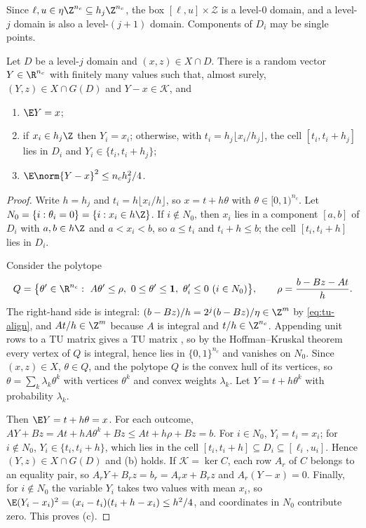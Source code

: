 Since $\ell,u\in\eta\Z^{n_c}\subseteq h_j\Z^{n_c}$, the box
$[\ell,u]\times\mathcal Z$ is a level-$0$ domain, and a level-$j$ domain is
also a level-$(j+1)$ domain. Components of $D_i$ may be single points.

\begin{lemma}\label{lem:tu-round}
Let $D$ be a level-$j$ domain and $(x,z)\in X\cap D$. There is a random vector
$Y\in\R^{n_c}$ with finitely many values such that, almost surely,
$(Y,z)\in X\cap G(D)$ and $Y-x\in\mathcal K$, and
\begin{enumerate}[label=(\alph*)]
\item $\E Y=x$;
\item if $x_i\in h_j\Z$ then $Y_i=x_i$; otherwise, with
$t_i=h_j\lfloor x_i/h_j\rfloor$, the cell $[t_i,t_i+h_j]$ lies in $D_i$ and
$Y_i\in\{t_i,t_i+h_j\}$;
\item $\E\norm{Y-x}^2\le n_ch_j^2/4$.
\end{enumerate}
\end{lemma}

\begin{proof}
Write $h=h_j$ and $t_i=h\lfloor x_i/h\rfloor$, so $x=t+h\theta$ with
$\theta\in[0,1)^{n_c}$. Let $N_0=\{i:\theta_i=0\}=\{i:x_i\in h\Z\}$. If
$i\notin N_0$, then $x_i$ lies in a component $[a,b]$ of $D_i$ with
$a,b\in h\Z$ and $a<x_i<b$, so $a\le t_i$ and $t_i+h\le b$; the cell
$[t_i,t_i+h]$ lies in $D_i$.

Consider the polytope
\[
Q=\bigl\{\theta'\in\R^{n_c}:\ A\theta'\le\rho,\ 0\le\theta'\le\mathbf 1,\
\theta'_i\le0\ (i\in N_0)\bigr\},\qquad \rho=\frac{b-Bz-At}{h}.
\]
The right-hand side is integral: $(b-Bz)/h=2^j(b-Bz)/\eta\in\Z^m$ by
\eqref{eq:tu-align}, and $At/h\in\Z^m$ because $A$ is integral and
$t/h\in\Z^{n_c}$. Appending unit rows to a TU matrix gives a TU matrix
\cite[Section~19.1]{Schrijver1986}, so by the Hoffman--Kruskal theorem
\cite{HoffmanKruskal1956} every vertex of $Q$ is integral, hence lies in
$\{0,1\}^{n_c}$ and vanishes on $N_0$. Since $(x,z)\in X$, $\theta\in Q$, and the
polytope $Q$ is the convex hull of its vertices, so
$\theta=\sum_k\lambda_k\theta^k$ with vertices $\theta^k$ and convex weights
$\lambda_k$. Let $Y=t+h\theta^k$ with probability $\lambda_k$.

Then $\E Y=t+h\theta=x$. For each outcome,
$AY+Bz=At+hA\theta^k+Bz\le At+h\rho+Bz=b$. For $i\in N_0$, $Y_i=t_i=x_i$; for
$i\notin N_0$, $Y_i\in\{t_i,t_i+h\}$, which lies in the cell
$[t_i,t_i+h]\subseteq D_i\subseteq[\ell_i,u_i]$. Hence $(Y,z)\in X\cap G(D)$
and (b) holds. If $\mathcal K=\ker C$, each row $A_r$ of $C$ belongs to an
equality pair, so $A_rY+B_rz=b_r=A_rx+B_rz$ and $A_r(Y-x)=0$. Finally, for
$i\notin N_0$ the variable $Y_i$ takes two values with mean $x_i$, so
$\E(Y_i-x_i)^2=(x_i-t_i)(t_i+h-x_i)\le h^2/4$, and coordinates in $N_0$
contribute zero. This proves (c).
\end{proof}

